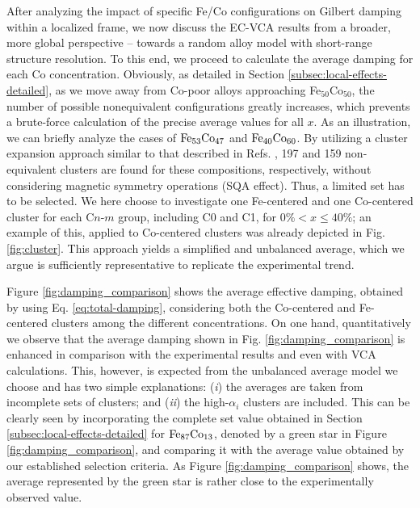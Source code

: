 After analyzing the impact of specific Fe/Co configurations on Gilbert damping within a localized frame, we now discuss the EC-VCA results from a broader, more global perspective -- towards a random alloy model with short-range structure resolution. To this end, we proceed to calculate the average damping for each Co concentration.
Obviously, as detailed in Section \ref{subsec:local-effects-detailed}, as we move away from Co-poor alloys approaching Fe$_{50}$Co$_{50}$, the number of possible nonequivalent configurations greatly increases, which prevents a brute-force calculation of the precise average values for all $x$. As an illustration, we can briefly analyze the cases of $\rm Fe_{53}Co_{47}$ and $\rm Fe_{40}Co_{60}$. By utilizing a cluster expansion approach similar to that described in Refs. \cite{jiang2024influence, PhysRevB.81.245210, he2020atom}, 197 and 159 non-equivalent clusters are found for these compositions, respectively, without considering magnetic symmetry operations (SQA effect). Thus, a limited set has to be selected. We here choose to investigate one Fe-centered and one Co-centered cluster for each C$n$-$m$ group, including C0 and C1, for $0\%<x\leq40\%$; an example of this, applied to Co-centered clusters was already depicted in Fig. \ref{fig:cluster}. This approach yields a simplified and unbalanced average, which we argue is sufficiently representative to replicate the experimental trend.


Figure \ref{fig:damping_comparison} shows the average effective damping, obtained by using Eq. \ref{eq:total-damping}, considering both the Co-centered and Fe-centered clusters among the different concentrations. On one hand, quantitatively we observe that the average damping shown in Fig. \ref{fig:damping_comparison} is enhanced in comparison with the experimental results and even with VCA calculations. This, however, is expected from the unbalanced average model we choose and has two simple explanations: (\textit{i}) the averages are taken from incomplete sets of clusters; and (\textit{ii}) the high-$\alpha_i$ clusters are included. This can be clearly seen by incorporating the complete set value obtained in Section \ref{subsec:local-effects-detailed} for $\rm Fe_{87}Co_{13}$, denoted by a green star in Figure \ref{fig:damping_comparison}, and comparing it with the average value obtained by our established selection criteria. As Figure \ref{fig:damping_comparison} shows, the average represented by the green star is rather close to the experimentally observed value.

